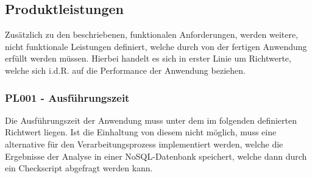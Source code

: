 
\subsection{Produktleistungen}
Zusätzlich zu den beschriebenen, funktionalen Anforderungen, werden weitere, nicht funktionale Leistungen definiert, welche durch von der fertigen Anwendung erfüllt werden müssen. Hierbei handelt es sich in erster Linie um Richtwerte, welche sich i.d.R. auf die Performance der Anwendung beziehen.

\subsubsection{PL001 - Ausführungszeit}\label{subsubsec:PL001}
Die Ausführungszeit der Anwendung muss unter dem im folgenden definierten Richtwert liegen. Ist die Einhaltung von diesem nicht möglich, muss eine alternative für den Verarbeitungsprozess implementiert werden, welche die Ergebnisse der Analyse in einer NoSQL-Datenbank speichert, welche dann durch ein Checkscript abgefragt werden kann.

